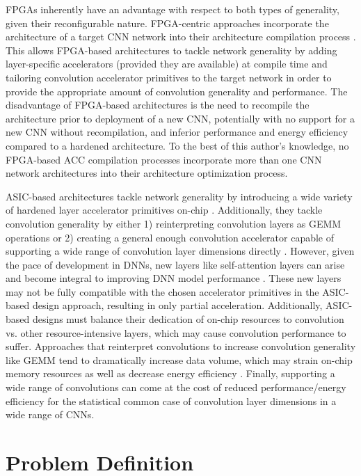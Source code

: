 FPGAs inherently have an advantage with respect to both types of generality,
given their reconfigurable nature. FPGA-centric approaches incorporate the
architecture of a target CNN network into their architecture compilation process
\cite{caffeine}. This allows FPGA-based architectures to tackle network
generality by adding layer-specific accelerators (provided they are available)
at compile time and tailoring convolution accelerator primitives to the target
network in order to provide the appropriate amount of convolution generality and
performance. The disadvantage of FPGA-based architectures is the need to
recompile the architecture prior to deployment of a new CNN, potentially with no
support for a new CNN without recompilation, and inferior performance and energy
efficiency compared to a hardened architecture. To the best of this author's
knowledge, no \ac{FPGA}-based \ac{ACC} compilation processes incorporate more
than one \ac{CNN} network architectures into their architecture optimization
process. 

ASIC-based architectures tackle network generality by introducing a wide variety
of hardened layer accelerator primitives on-chip \cite{tpu}. Additionally, they
tackle convolution generality by either 1) reinterpreting convolution layers as
GEMM operations or 2) creating a general enough convolution accelerator capable
of supporting a wide range of convolution layer dimensions directly
\cite{eyerissv2}. However, given the pace of development in DNNs, new layers
like self-attention layers \cite{transformer_model} can arise and become
integral to improving DNN model performance \cite{conv_and_transformers}. These
new layers may not be fully compatible with the chosen accelerator primitives in
the ASIC-based design approach, resulting in only partial acceleration.
Additionally, ASIC-based designs must balance their dedication of on-chip
resources to convolution vs. other resource-intensive layers, which may cause
convolution performance to suffer. Approaches that reinterpret convolutions to
increase convolution generality like GEMM tend to dramatically increase data
volume, which may strain on-chip memory resources as well as decrease energy
efficiency \cite{caffeine}. Finally, supporting a wide range of convolutions can
come at the cost of reduced performance/energy efficiency for the statistical
common case of convolution layer dimensions in a wide range of CNNs.

\section{Problem Definition}
\label{chap:intro:prob_def}

